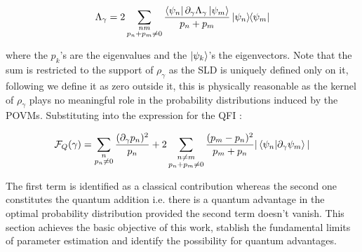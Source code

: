 \begin{equation}
  \Lambda_{\gamma} = 2\sum_{\substack{nm\\ p_{n}+p_{m}\neq 0}}\frac{\bra{\psi_{n}}\partial_{\gamma}\Lambda_{\gamma}\ket{\psi_{m}}}{p_{n} + p_{m}}\ketbratwo{\psi_{n}}{\psi_{m}}
\end{equation}

where the $p_{k}$'s are the eigenvalues and the $\ket{\psi_{k}}$'s the eigenvectors. Note that the sum is restricted to the support of
$\rho_{\gamma}$ as the SLD is uniquely defined only on it, following \cite{braunstein_statistical_1994} we define it as zero outside it,
this is physically reasonable as the kernel of $\rho_{\gamma}$ plays no meaningful role in the probability distributions induced by the POVMs.
Substituting into the expression for the QFI \cite{paris_quantum_2009}:

\begin{equation}
  \mathcal{F}_{Q}(\gamma) = \sum_{\substack{n\\p_{n}\neq 0}} \frac{(\partial_{\gamma}p_{n})^{2}}{p_{n}} + 2\sum_{\substack{n\neq m\\p_{n} +p_{m}\neq 0}}
  \frac{(p_{m}-p_{n})^{2}}{p_{m}+p_{n}}|\braket{\psi_{n}|\partial_{\gamma}\psi_{m}}|
\end{equation}

The first term is identified as a classical contribution whereas the second one constitutes the quantum addition i.e. there is a quantum
advantage in the optimal probability distribution provided the second term doesn't vanish. This section achieves the basic objective of this
work, stablish the fundamental limits of parameter estimation and identify the possibility for quantum advantages.
